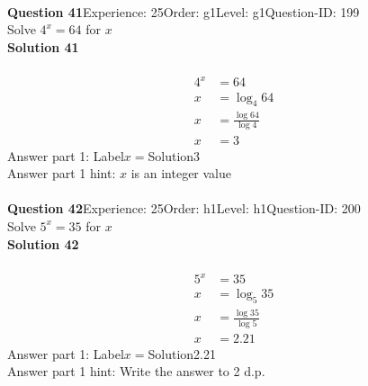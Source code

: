 \documentclass{article}
\begin{document}
\\[4pt]
\noindent\textbf{Question 41}\hspace{20pt}Experience: 25\hspace{20pt}Order: g1\hspace{20pt}Level: g1\hspace{20pt}Question-ID: 199\\[2pt]
Solve $4^x=64$ for $x$\\[4pt]
\noindent\textbf{Solution 41}\\[2pt]
\\[-35pt]\begin{align*}
4^x&=64\\[2pt]
x&=\log_{4}64\\[2pt]
x&=\displaystyle\frac{\log64}{\log4}\\[2pt]
x&=3
\end{align*}
Answer part 1: \hspace{10pt}Label\hspace{10pt}$x=$\hspace{10pt}Solution\hspace{10pt}3\\
Answer part 1 hint: \hspace{15pt}$x$ is an integer value\\
\\[4pt]
\noindent\textbf{Question 42}\hspace{20pt}Experience: 25\hspace{20pt}Order: h1\hspace{20pt}Level: h1\hspace{20pt}Question-ID: 200\\[2pt]
Solve $5^x=35$ for $x$\\[4pt]
\noindent\textbf{Solution 42}\\[2pt]
\\[-35pt]\begin{align*}
5^x&=35\\[2pt]
x&=\log_{5}35\\[2pt]
x&=\displaystyle\frac{\log35}{\log5}\\[2pt]
x&=2.21
\end{align*}
Answer part 1: \hspace{10pt}Label\hspace{10pt}$x=$\hspace{10pt}Solution\hspace{10pt}2.21\\
Answer part 1 hint: \hspace{15pt}Write the answer to 2 d.p.\\
\end{document}
